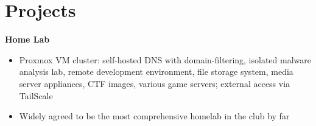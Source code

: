 \documentclass{article}
\newcommand{\topLevelProjectItem}[2]{
    \textbf{#1}\hfill \emph{#2}\newline
    \vspace{-18pt}\begin{itemize}
}
\newcommand{\topLevelItemEnd}{\end{itemize}\vspace{5pt}}
\newcommand{\lowLevelItem}[1]{
    \item\small{#1}\vspace{-8pt}
}
\begin{document}
    \section*{Projects}
        \topLevelProjectItem{Home Lab}{{}} %
            \lowLevelItem{Proxmox VM cluster: self-hosted DNS with domain-filtering, isolated malware analysis lab, remote development environment, file storage system, media server appliances, CTF images, various game servers; external access via TailScale}
            \lowLevelItem{Widely agreed to be the most comprehensive homelab in the club by far}
        \topLevelItemEnd
\end{document}
